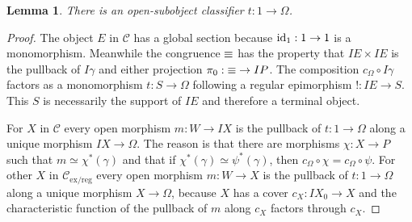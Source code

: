 \documentclass[sort&compress]{elsarticle}
\theoremstyle{plain}
\newtheorem{lemma}[theorem]{Lemma}
\theoremstyle{definition}
\theoremstyle{remark}
\newcommand\hide[1]{}
\newcommand\cat\mathcal
\newcommand\exlex{_\mathrm{ex/lex}}
\newcommand\exreg{_\mathrm{ex/reg}}
\begin{document}
\hide{
\begin{lemma} There is a natural isomorphism $\cat C\exlex (I-,\Omega) \to \cl(I-)$.\label{iso1} \end{lemma}

\begin{proof} The relation $\exeq$ is defined in such a way, that $c_\Omega\circ If = c_\Omega\circ Ig$ if and only if $f\inv(\db{I \gamma}) = g\inv(\db{I \gamma})$ for each pair $f,g:X\to P$. Meanwhile, $I:\sub(X) \to \cl(IX)$ is an isomorphism by lemma \ref{charclosed}. 
The map $\cat C\exlex (IX,\Omega) \to \cl(IX)$ takes a morphism $f:IX\to \Omega$, factors it as $c_\Omega\circ If_0$ and then pulls $I\gamma$ back along $If_0$. This is a well defined and injective map, because every factorization of $f$ through $c_\Omega$ gives the same open subobject of $IX$. It is surjective because $\gamma$ is a generic monomorphism.

If $g:X\to Y$, then $\cl(Ig):\cl(IY) \to \cl(IX)$ commutes with $\cat C\exlex(Ig,\Omega)$ because if $h = c_\Omega\circ Ih_0:Y\to \Omega$ then $h\circ g = c_\Omega\circ Ih_0\circ g$. 
\end{proof}
}

\begin{lemma} There is an open-subobject classifier $t:1\to \Omega$. \label{iso3} \end{lemma}

\begin{proof} The object $E$ in $\cat C$ has a global section because $\mathrm{id}_1:1\to 1$ is a monomorphism. Meanwhile the congruence $\exeq$ has the property that $IE\times IE$ is the pullback of $I\gamma$ and either projection $\pi_0:\mathord {\equiv} \to IP$. The composition $c_\Omega\circ I\gamma$ factors as a monomorphism $t:S\to \Omega$ following a regular epimorphism $!:IE\to S$. This $S$ is necessarily the support of $IE$ and therefore a terminal object.

For $X$ in $\cat C$ every open morphism $m:W\to IX$ is the pullback of $t:1\to \Omega$ along a unique morphism $IX\to \Omega$. The reason is that there are morphisms $\chi:X\to P$ such that $m \simeq \chi^*(\gamma)$ and that if $\chi^*(\gamma)\simeq \psi^*(\gamma)$, then $c_\Omega\circ \chi = c_\Omega\circ \psi$. For other $X$ in $\cat C\exreg$ every open morphism $m:W\to X$ is the pullback of $t:1\to \Omega$ along a unique morphism $X\to \Omega$, because $X$ has a cover $c_X:IX_0 \to X$ and the characteristic function of the pullback of $m$ along $c_X$ factors through $c_X$.\end{proof}
\end{document}
